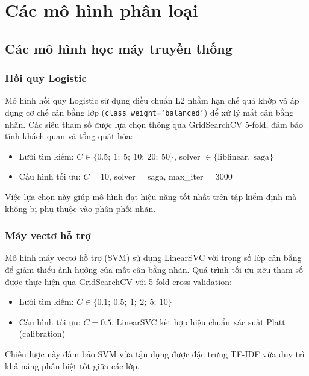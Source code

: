 \documentclass[12pt, a4paper]{report}
\newcommand{\lrBestC}{10}               %
\newcommand{\svmBestC}{0.5}             %
\begin{document}
\section{Các mô hình phân loại}

\subsection{Các mô hình học máy truyền thống}

\subsubsection{Hồi quy Logistic}

Mô hình hồi quy Logistic sử dụng điều chuẩn L2 nhằm hạn chế quá khớp và áp dụng cơ chế cân bằng lớp (\texttt{class\_weight=`balanced'}) để xử lý mất cân bằng nhãn. Các siêu tham số được lựa chọn thông qua GridSearchCV 5-fold, đảm bảo tính khách quan và tổng quát hóa:

\begin{itemize}[leftmargin=2em]
  \item Lưới tìm kiếm: $C \in \{0.5;\ 1;\ 5;\ 10;\ 20;\ 50\}$, solver $\in \{\text{liblinear},\ \text{saga}\}$
  \item Cấu hình tối ưu: $C = \lrBestC$, solver = saga, max\_iter = 3000
\end{itemize}

Việc lựa chọn này giúp mô hình đạt hiệu năng tốt nhất trên tập kiểm định mà không bị phụ thuộc vào phân phối nhãn.

\subsubsection{Máy vectơ hỗ trợ}

Mô hình máy vectơ hỗ trợ (SVM) sử dụng LinearSVC với trọng số lớp cân bằng để giảm thiểu ảnh hưởng của mất cân bằng nhãn. Quá trình tối ưu siêu tham số được thực hiện qua GridSearchCV với 5-fold cross-validation:

\begin{itemize}[leftmargin=2em]
  \item Lưới tìm kiếm: $C \in \{0.1;\ 0.5;\ 1;\ 2;\ 5;\ 10\}$
  \item Cấu hình tối ưu: $C = \svmBestC$, LinearSVC kết hợp hiệu chuẩn xác suất Platt (calibration)
\end{itemize}

Chiến lược này đảm bảo SVM vừa tận dụng được đặc trưng TF-IDF vừa duy trì khả năng phân biệt tốt giữa các lớp.
\end{document}
